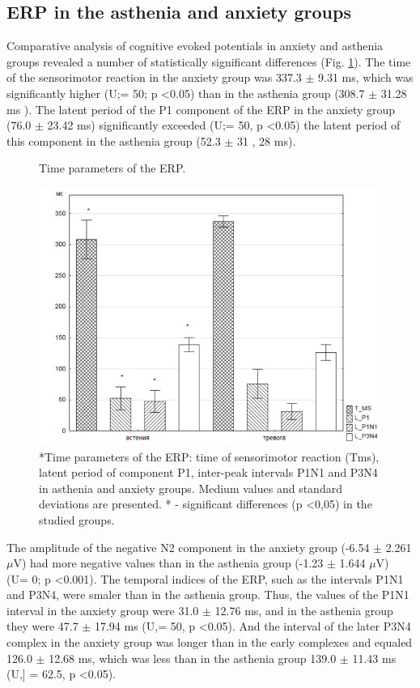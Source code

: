 \documentclass[twocolumn]{article}
\begin{document}
\subsection{	ERP in the asthenia and anxiety groups}
\par Comparative analysis of cognitive evoked potentials in anxiety and asthenia groups revealed a number of statistically significant differences (Fig. \ref{fig3}). The time of the sensorimotor reaction in the anxiety group was 337.3 $\pm$ 9.31 ms, which was significantly higher (U\cite{bib15};\cite{bib15}= 50; p \textless{}0.05) than in the asthenia group (308.7 $\pm$ 31.28 ms ). The latent period of the P1 component of the ERP in the anxiety group (76.0 $\pm$ 23.42 ms) significantly exceeded (U\cite{bib15};\cite{bib15}= 50, p \textless{}0.05) the latent period of this component in the asthenia group (52.3 $\pm$ 31 , 28 ms).
\begin{figure}
\caption{Time parameters of the ERP.}
\label{fig3}
\includegraphics[width=\linewidth ]{fig3.png}
\caption*{*Time parameters of the ERP: time of sensorimotor reaction (T\textunderscore{}ms), latent period of component P1, inter-peak intervals P1N1 and P3N4 in asthenia and anxiety groups. Medium values and standard deviations are presented. * - significant differences (p \textless{}0,05) in the studied groups.}
\end{figure}
\par The amplitude of the negative N2 component in the anxiety group (-6.54 $\pm$ 2.261 $\mu$V) had more negative values than in the asthenia group (-1.23 $\pm$ 1.644 $\mu$V) (U\cite{bib15}= 0; p \textless{}0.001). The temporal indices of the ERP, such as the intervals P1N1 and P3N4, were smaler than in the asthenia group. Thus, the values of the P1N1 interval in the anxiety group were 31.0 $\pm$ 12.76 ms, and in the asthenia group they were 47.7 $\pm$ 17.94 ms (U\cite{bib15},\cite{bib15}= 50, p \textless{}0.05). And the interval of the later P3N4 complex  in the anxiety group was longer than in the early complexes and equaled 126.0 $\pm$ 12.68 ms, which was less than in the asthenia group 139.0 $\pm$ 11.43 ms (U\cite{bib15},\cite{bib15}] = 62.5, p \textless{}0.05).
\end{document}
